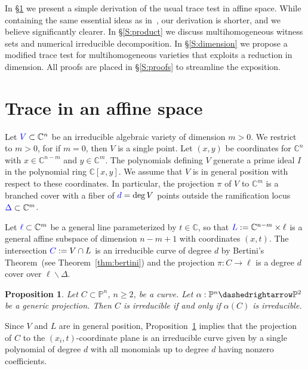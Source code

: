 \documentclass[12pt]{amsart}
\newtheorem{proposition}[theorem]{Proposition}
\theoremstyle{definition}
\begin{document}
In \S\ref{S:affine} we present a simple derivation of the usual trace test in affine space.
While containing the same essential ideas as in~\cite{SVW_trace}, our derivation is shorter,
and we believe significantly clearer.
In \S\ref{S:product} we discuss multihomogeneous witness sets and numerical irreducible decomposition.
In \S\ref{S:dimension} we propose a modified trace test for multihomogeneous varieties that exploits a
reduction in dimension.
All proofs are placed in \S\ref{S:proofs} to streamline the exposition.

\section{Trace in an affine space}\label{S:affine}

Let ${{\color{blue}{V}}}\subset{{\mathbb{C}}}^n$ be an irreducible algebraic variety of dimension $m>0$.
We restrict to $m>0$, for if $m=0$, then $V$ is a single point.
Let $(x,y)$ be coordinates for ${{\mathbb{C}}}^n$ with $x\in{{\mathbb{C}}}^{n-m}$ and $y\in{{\mathbb{C}}}^m$.
The polynomials defining $V$ generate a prime ideal $I$ in the polynomial ring ${{\mathbb{C}}}[x,y]$.
We assume that $V$ is in general position with respect to these coordinates.
In particular, the projection $\pi$ of $V$ to ${{\mathbb{C}}}^m$ is a branched cover with a fiber of
${{\color{blue}{d}}}=\deg V$ points outside the ramification locus ${{\color{blue}{\Delta}}}\subset{{\mathbb{C}}}^m$.

Let ${{\color{blue}{\ell}}}\subset{{\mathbb{C}}}^m$ be a general line parameterized by $t\in{{\mathbb{C}}}$, so that
${{\color{blue}{L}}}:={{\mathbb{C}}}^{n-m}\times\ell$ is a general affine subspace of dimension $n{-}m{+}1$ with coordinates
$(x,t)$.
The intersection ${{\color{blue}{C}}}:=V\cap L$ is an irreducible curve of degree $d$ by Bertini's
Theorem~(see Theorem~\ref{thm:bertini}) and the projection $\pi\colon C\to\ell$ is a degree $d$ cover over
$\ell\smallsetminus\Delta$.

\begin{proposition}\label{prop:generic-projection-to-P2}
 Let $C\subset {{\mathbb{P}}}^n$, $n\geq 2$, be a curve. Let $\alpha:{{\mathbb{P}}}^n{\dashedrightarrow} {{\mathbb{P}}}^2$ be a generic projection.
 Then $C$ is irreducible if and only if $\alpha(C)$ is irreducible.
\end{proposition}

Since $V$ and $L$ are in general position, Proposition~\ref{prop:generic-projection-to-P2} implies that
the projection of $C$ to the  $(x_i,t)$-coordinate plane
is an irreducible curve given by a single polynomial {{\color{blue}{$f(x_i,t)$}}} of degree $d$ with all
monomials up to degree $d$ having nonzero coefficients.
\end{document}
